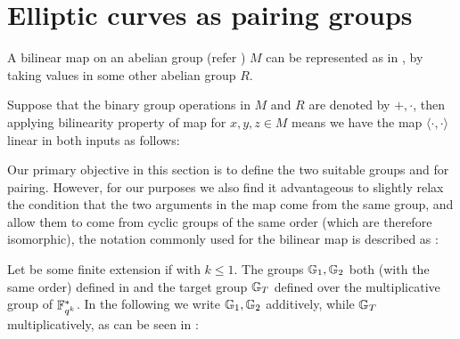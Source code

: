 
\section{Elliptic curves as pairing groups}
\label{sec:ch1.ellipticcurvesaspairinggroups}
%


A bilinear map on an abelian group (refer ) $M$ can be represented as in , by taking values in some other
abelian group $R$. 


Suppose that the binary group operations in $M$ and $R$ are denoted by $+,\cdot $, then applying  bilinearity property of map for $x,y,z \in M$  means we have the map $\langle \cdot, \cdot \rangle$ linear in both inputs as follows:


Our primary objective in this section is to define the two suitable groups  and  for pairing.  However, for our purposes we also find it advantageous to slightly relax the condition that the two arguments in the map come from the same group, and allow them to come from cyclic groups of the same order (which are therefore isomorphic), the notation commonly used for the bilinear map is described as : 


Let  be some finite extension if \FieldFq with $k \leq 1$. The groups $\mathbb{G}_1, \mathbb{G}_2$ both (with the same order) defined in  and the target group $\mathbb{G}_T$ defined over the multiplicative group of $\mathbb{F}_{q^k}^*$. In the following we write $\mathbb{G}_1, \mathbb{G}_2$ additively, while $\mathbb{G}_T$ multiplicatively, as can be seen in :


